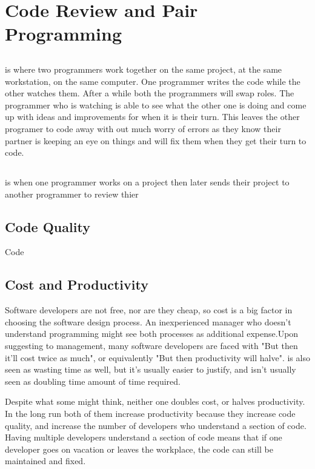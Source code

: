 \documentclass{article}
\begin{document}
\section{Code Review and Pair Programming}

\subsection{\PP}
\PP is where two programmers work together on the same project, at the same workstation, on the same computer. One programmer writes the code while the other watches them. After a while both the programmers will swap roles. The programmer who is watching is able to see what the other one is doing and come up with ideas and improvements for when it is their turn. This leaves the other programer to code away with out much worry of errors as they know their partner is keeping an eye on things and will fix them when they get their turn to code.

\subsection{\CR}
\CR is when one programmer works on a project then later sends their project to another programmer to review thier 

\subsection{Code Quality}

Code

\subsection{Cost and Productivity}

Software developers are not free, nor are they cheap, so cost is a big factor in choosing the software design process. An inexperienced manager who doesn't understand programming might see both processes as additional expense.Upon suggesting \PP to management, many software developers are faced with "But then it'll cost twice as much", or equivalently "But then productivity will halve". \CR is also seen as wasting time as well, but it's usually easier to justify, and isn't usually seen as doubling time amount of time required.

Despite what some might think, neither one doubles cost, or halves productivity. In the long run both of them increase productivity because they increase code quality, and increase the number of developers who understand a section of code. Having multiple developers understand a section of code means that if one developer goes on vacation or leaves the workplace, the code can still be maintained and fixed.
\end{document}
